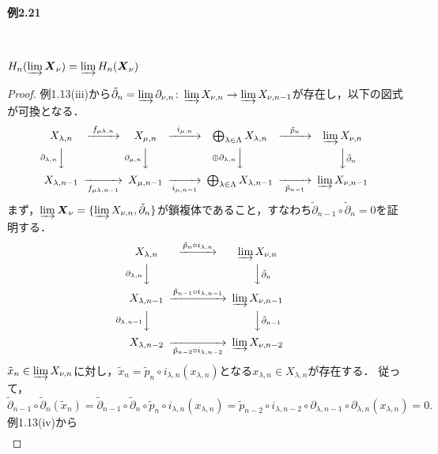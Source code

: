 \paragraph{例2.21}~
\begin{screen}
  $H_n(\varinjlim \boldsymbol{X}_\nu) = \varinjlim H_n(\boldsymbol{X}_\nu)$
\end{screen}
\begin{proof}
  例1.13(iii)から$\tilde\partial_n = \varinjlim \partial_{\nu, n} \colon \varinjlim X_{\nu, n} \to \varinjlim X_{\nu, n-1}$が存在し，以下の図式が可換となる．
  \[
  \begin{CD}
    X_{\lambda, n} @>{f_{\mu\lambda, n}}>> X_{\mu, n} @>{i_{\mu, n}}>> \bigoplus_{\lambda \in \Lambda} X_{\lambda, n} @>{\tilde{p}_n}>> \varinjlim X_{\nu, n} \\
    @V{\partial_{\lambda, n}}VV  @V{\partial_{\mu, n}}VV  @V{\oplus \partial_{\lambda, n}}VV  @VV{\tilde{\partial}_n}V \\
    X_{\lambda, n-1} @>>{f_{\mu\lambda, n-1}}> X_{\mu, n-1} @>>{i_{\mu, n-1}}> \bigoplus_{\lambda \in \Lambda} X_{\lambda, n-1} @>>{\tilde{p}_{n-1}}> \varinjlim X_{\nu, n-1}
  \end{CD}
  \]
  まず，$\varinjlim \boldsymbol{X}_\nu = \{ \varinjlim X_{\nu, n}, \tilde\partial_n \}$が鎖複体であること，すなわち$\tilde\partial_{n-1} \circ \tilde\partial_n = 0$を証明する．
  \[
  \begin{CD}
    X_{\lambda, n}  @>{\tilde{p}_n \circ i_{\lambda, n}}>> \varinjlim X_{\nu, n} \\
    @V{\partial_{\lambda, n}}VV  @VV{\tilde\partial_n}V \\
    X_{\lambda, n-1}  @>{\tilde{p}_{n-1} \circ i_{\lambda, n-1}}>> \varinjlim X_{\nu, n-1} \\
    @V{\partial_{\lambda, n-1}}VV  @VV{\tilde\partial_{n-1}}V \\
    X_{\lambda, n-2}  @>>{\tilde{p}_{n-2} \circ i_{\lambda, n-2}}> \varinjlim X_{\nu, n-2}
  \end{CD}
  \]
  $\tilde{x}_n \in \varinjlim X_{\nu, n}$に対し，$\tilde{x}_n = \tilde{p}_n \circ i_{\lambda, n}(x_{\lambda, n})$となる$x_{\lambda, n} \in X_{\lambda, n}$が存在する．
  従って，
  \[ \tilde\partial_{n-1} \circ \tilde\partial_n (\tilde{x}_n) = \tilde\partial_{n-1} \circ \tilde\partial_n \circ \tilde{p}_n \circ i_{\lambda, n}(x_{\lambda, n}) = \tilde{p}_{n-2} \circ i_{\lambda, n-2} \circ \partial_{\lambda, n-1} \circ \partial_{\lambda, n}(x_{\lambda, n}) = 0. \]
  例1.13(iv)から
  \begin{align}

\end{align}
\end{proof}
